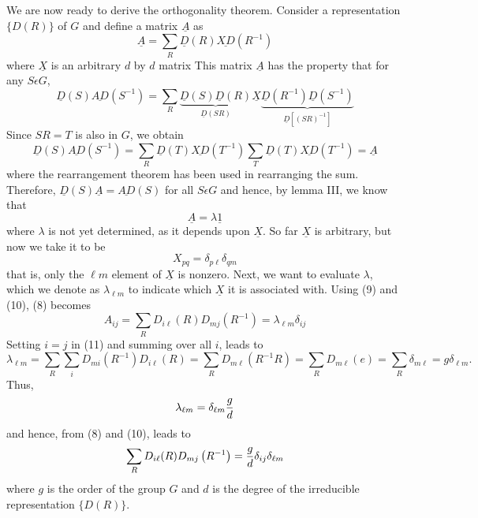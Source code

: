 We are now ready to derive the orthogonality theorem.  Consider a 
representation $\{D(R)\}$ of $G$ and define a matrix $\underline{A}$ as
\begin{equation}
\underline{A} = \sum_{R} \underline{D} (R) \underline{XD} \left( 
R^{-1} \right)
\label{chap16app-eqno8}
\end{equation}
where $\underline{X}$ is an arbitrary $d$ by $d$ matrix  This 
matrix $\underline{A}$ has the property that for any $S \epsilon G$,
\begin{equation}
\underline{D} (S) \underline{AD} \left( S^{-1} \right) = \sum_{R} 
\underbrace{\underline{D}(S)\underline{D}(R)}_{\underline{D}(SR)} 
\underline{X} \underbrace{\underline{D}\left(R^{-1}\right) 
\underline{D} \left(S^{-1}\right)}_{\underline{D} \left[ \left( SR 
\right)^{-1}\right]}
\end{equation}
Since $SR = T$ is also in $G$, we obtain
\begin{equation}
\underline{D} (S) \underline{AD} \left( S^{-1} \right) = \sum_{R} 
\underline{D} (T) \underline{XD} \left( T^{-1} \right)  \sum_{T} 
\underline{D} (T) \underline{XD} \left( T^{-1} \right) = \underline{A}
\end{equation}
where the rearrangement theorem has been used in rearranging the 
sum.  Therefore, $\underline{D}(S)\underline{A} = \underline{AD}(S)$ 
for all $S \epsilon G$ and hence, by lemma III, we know that
\begin{equation}
\underline{A} = \lambda \underline{1}
\label{chap16app-eqno9}
\end{equation}
where $\lambda$ is not yet determined, as it depends upon 
$\underline{X}$.  So far $\underline{X}$ is arbitrary, but now we take 
it to be
\begin{equation}
X_{pq} = \delta_{p \ell} \delta_{qm}
\label{chap16app-eqno10}
\end{equation}
that is, only the $\ell m$ element of $\underline{X}$ is nonzero.  
Next, we want to evaluate $\lambda$, which we denote as $\lambda_{\ell 
m}$ to indicate which $\underline{X}$ it is associated with.  Using 
(9) and (10), (8) becomes
\begin{equation}
A_{ij} = \sum_{R} D_{i\ell} (R) D_{mj} \left( R^{-1} \right) = 
\lambda_{\ell m} \delta_{ij}
\label{chap16app-eqno11}
\end{equation}
Setting $i = j$ in (11) and summing over all $i$, leads to
\begin{equation}
\lambda_{\ell m} = \sum_{R} \sum_{i} D_{mi} \left( R^{-1} \right) 
D_{i \ell} (R) = \sum_{R} D_{m\ell} \left( R^{-1}R \right) = \sum_{R} 
D_{m\ell} (e) = \sum_{R} \delta_{m\ell} = g \delta_{\ell m}.
\end{equation}
Thus, 
\begin{equation}
\lambda_{\ell m} = \delta_{\ell m} {g \over d}
\end{equation}
and hence, from (8) and (10), leads to
\begin{equation}
\sum_{R} D_{i\ell} (R) D_{mj} \left( R^{-1} \right) = {g \over d} 
\delta_{ij} \delta_{\ell m}
\label{chap16app-eqno12}
\end{equation}
where $g$ is the order of the group $G$ and $d$ is the degree of the 
irreducible representation $\{D(R)\}$.

